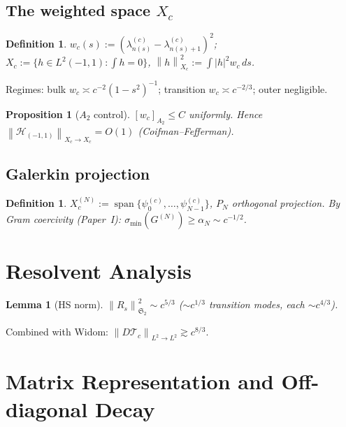 \documentclass[12pt,a4paper]{article}
\newtheorem{proposition}[theorem]{Proposition}
\newtheorem{lemma}[theorem]{Lemma}
\newtheorem{definition}[theorem]{Definition}
\newcommand{\Xc}{X_c}
\newcommand{\Tc}{\mathcal{T}_c}
\newcommand{\Hil}{\mathcal{H}_{(-1,1)}}
\newcommand{\norm}[1]{\left\|#1\right\|}
\newcommand{\pswf}[1]{\psi_{#1}^{(c)}}
\newcommand{\lam}[1]{\lambda_{#1}^{(c)}}
\begin{document}
\subsection{The weighted space $X_c$}

\begin{definition}\label{def:Xc}
$w_c(s):=(\lam{n(s)}-\lam{n(s)+1})^2$;
$\Xc:=\{h\in L^2(-1,1):\int h=0\}$,
$\norm{h}_{\Xc}^2:=\int|h|^2w_c\,ds$.
\end{definition}

Regimes: bulk $w_c\asymp c^{-2}(1-s^2)^{-1}$;
transition $w_c\asymp c^{-2/3}$; outer negligible.

\begin{proposition}[$A_2$ control]\label{prop:A2}
$[w_c]_{A_2}\leq C$ uniformly.
Hence $\norm{\Hil}_{\Xc\to\Xc}=O(1)$
(Coifman--Fefferman).
\end{proposition}

\subsection{Galerkin projection}

\begin{definition}\label{def:Galerkin}
$X_c^{(N)}:=\operatorname{span}\{\pswf{0},\ldots,\pswf{N-1}\}$,
$P_N$ orthogonal projection.
By Gram coercivity (Paper~I):
$\sigma_{\min}(G^{(N)})\geq\alpha_N\sim c^{-1/2}$.
\end{definition}

\section{Resolvent Analysis}
\label{sec:resolvent}

\begin{lemma}[HS norm]\label{lem:HS}
$\norm{R_s}_{\mathfrak{S}_2}^2\sim c^{5/3}$
($\sim c^{1/3}$ transition modes, each $\sim c^{4/3}$).
\end{lemma}

Combined with Widom: $\norm{D\Tc}_{L^2\to L^2}\gtrsim c^{8/3}$.

\section{Matrix Representation and Off-diagonal Decay}
\label{sec:matrix}
\end{document}

